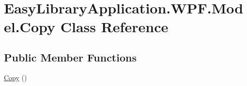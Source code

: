 \hypertarget{class_easy_library_application_1_1_w_p_f_1_1_model_1_1_copy}{}\section{Easy\+Library\+Application.\+W\+P\+F.\+Model.\+Copy Class Reference}
\label{class_easy_library_application_1_1_w_p_f_1_1_model_1_1_copy}
\subsection*{Public Member Functions}
\begin{DoxyCompactItemize}
\item 
\mbox{\hyperlink{class_easy_library_application_1_1_w_p_f_1_1_model_1_1_copy_ac94bd8695db27e1118a29b5905860fc1}{Copy}} ()
\end{DoxyCompactItemize}
